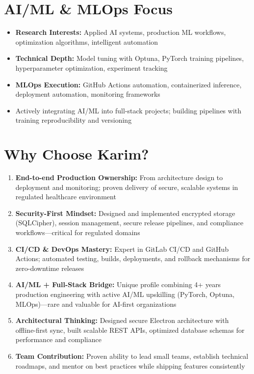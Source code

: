 \documentclass[11pt,a4paper]{article}
\begin{document}
\section{AI/ML \& MLOps Focus}

\begin{itemize}
    \item \textbf{Research Interests:} Applied AI systems, production ML workflows, optimization algorithms, intelligent automation
    \item \textbf{Technical Depth:} Model tuning with Optuna, PyTorch training pipelines, hyperparameter optimization, experiment tracking
    \item \textbf{MLOps Execution:} GitHub Actions automation, containerized inference, deployment automation, monitoring frameworks
    \item Actively integrating AI/ML into full-stack projects; building pipelines with training reproducibility and versioning
\end{itemize}

\vspace{6pt}

\section{Why Choose Karim?}

\begin{enumerate}[label=\textbf{\arabic*.}]
    \item \textbf{End-to-end Production Ownership:} From architecture design to deployment and monitoring; proven delivery of secure, scalable systems in regulated healthcare environment
    
    \item \textbf{Security-First Mindset:} Designed and implemented encrypted storage (SQLCipher), session management, secure release pipelines, and compliance workflows—critical for regulated domains
    
    \item \textbf{CI/CD \& DevOps Mastery:} Expert in GitLab CI/CD and GitHub Actions; automated testing, builds, deployments, and rollback mechanisms for zero-downtime releases
    
    \item \textbf{AI/ML + Full-Stack Bridge:} Unique profile combining 4+ years production engineering with active AI/ML upskilling (PyTorch, Optuna, MLOps)—rare and valuable for AI-first organizations
    
    \item \textbf{Architectural Thinking:} Designed secure Electron architecture with offline-first sync, built scalable REST APIs, optimized database schemas for performance and compliance
    
    \item \textbf{Team Contribution:} Proven ability to lead small teams, establish technical roadmaps, and mentor on best practices while shipping features consistently
\end{enumerate}
\end{document}
